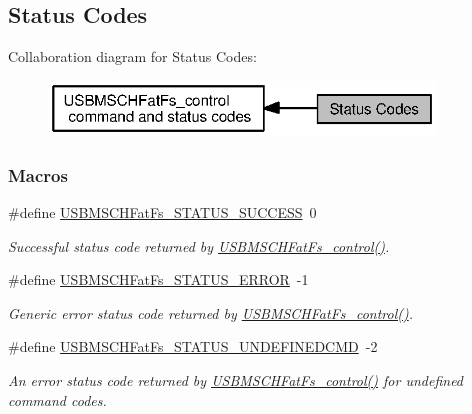 \subsection{Status Codes}
\label{group___u_s_b_m_s_c_h_fat_fs___s_t_a_t_u_s}
Collaboration diagram for Status Codes\+:
\nopagebreak
\begin{figure}[H]
\begin{center}
\leavevmode
\includegraphics[width=291pt]{group___u_s_b_m_s_c_h_fat_fs___s_t_a_t_u_s}
\end{center}
\end{figure}
\subsubsection*{Macros}
\begin{DoxyCompactItemize}
\item 
\#define \hyperlink{group___u_s_b_m_s_c_h_fat_fs___s_t_a_t_u_s_ga40e5ecd349cbaeb9f524b568240822d3}{U\+S\+B\+M\+S\+C\+H\+Fat\+Fs\+\_\+\+S\+T\+A\+T\+U\+S\+\_\+\+S\+U\+C\+C\+E\+S\+S}~0
\begin{DoxyCompactList}\small\item\em Successful status code returned by \hyperlink{_u_s_b_m_s_c_h_fat_fs_8h_a8725aac569cefabe624b5bfda0d07422}{U\+S\+B\+M\+S\+C\+H\+Fat\+Fs\+\_\+control()}. \end{DoxyCompactList}\item 
\#define \hyperlink{group___u_s_b_m_s_c_h_fat_fs___s_t_a_t_u_s_gabf90bd396f6e1caf142983768aafee6d}{U\+S\+B\+M\+S\+C\+H\+Fat\+Fs\+\_\+\+S\+T\+A\+T\+U\+S\+\_\+\+E\+R\+R\+O\+R}~-\/1
\begin{DoxyCompactList}\small\item\em Generic error status code returned by \hyperlink{_u_s_b_m_s_c_h_fat_fs_8h_a8725aac569cefabe624b5bfda0d07422}{U\+S\+B\+M\+S\+C\+H\+Fat\+Fs\+\_\+control()}. \end{DoxyCompactList}\item 
\#define \hyperlink{group___u_s_b_m_s_c_h_fat_fs___s_t_a_t_u_s_ga60260295df38b47e3e58ec29003d52b4}{U\+S\+B\+M\+S\+C\+H\+Fat\+Fs\+\_\+\+S\+T\+A\+T\+U\+S\+\_\+\+U\+N\+D\+E\+F\+I\+N\+E\+D\+C\+M\+D}~-\/2
\begin{DoxyCompactList}\small\item\em An error status code returned by \hyperlink{_u_s_b_m_s_c_h_fat_fs_8h_a8725aac569cefabe624b5bfda0d07422}{U\+S\+B\+M\+S\+C\+H\+Fat\+Fs\+\_\+control()} for undefined command codes. \end{DoxyCompactList}\end{DoxyCompactItemize}


